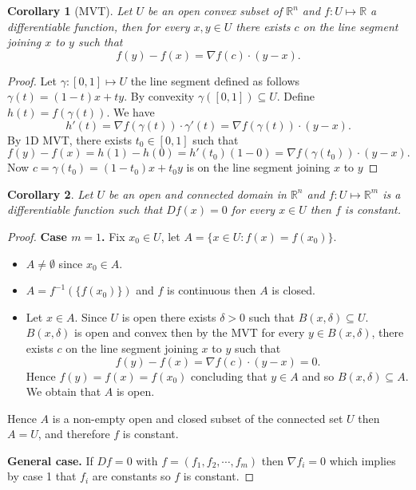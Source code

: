 \documentclass[11pt,openany]{book}
\theoremstyle{plain}
\newtheorem{corollary}{Corollary}[chapter]
\theoremstyle{definition}
\theoremstyle{remark}
\begin{document}
\begin{corollary}[MVT]
    Let $U$ be an open convex subset of $\mathbb R^n$ and $f:U\mapsto \mathbb R$ a differentiable function, then for every $x,y\in U$ there exists $c$ on the line segment joining $x$ to $y$ such that
    $$f(y)-f(x)=\nabla f(c)\cdot (y-x).$$
\end{corollary}

\begin{proof}
    Let $\gamma:[0,1]\mapsto U$ the line segment defined as follows $\gamma(t)=(1-t)x+ty$. By convexity $\gamma([0,1])\subseteq U$. Define $h(t)=f(\gamma (t)).$ We have $$h'(t)=\nabla f(\gamma(t))\cdot \gamma'(t)=\nabla f(\gamma(t))\cdot (y-x).$$
    By 1D MVT, there exists $t_0\in [0,1]$ such that
    $$f(y)-f(x)=h(1)-h(0)=h'(t_0)(1-0)=\nabla f(\gamma(t_0))\cdot (y-x).$$
    Now $c=\gamma(t_0)=(1-t_0)x+t_0y$ is on the line segment joining $x$ to $y$
\end{proof}

\begin{corollary}
    Let $U$ be an open and connected domain in $\mathbb R^n$ and $f:U\mapsto \mathbb R^m$ is a differentiable function such that $Df(x)=0$ for every $x\in U$ then $f$ is constant.
    
\end{corollary}

\begin{proof}
    {\bf Case $m=1$.} 
    Fix $x_0\in U$, let $A=\{x\in U: f(x)=f(x_0)\}.$ 
    \begin{itemize}
        \item $A\neq \emptyset$ since $x_0\in A$.
        \item $A=f^{-1}(\{f(x_0)\})$ and $f$ is continuous then $A$ is closed.
        \item Let $x\in A.$ Since $U$ is open there exists $\delta>0$ such that $B(x,\delta)\subseteq U$. $B(x,\delta)$ is open and convex then by the MVT for every $y\in B(x,\delta)$, there exists $c$ on the line segment joining $x$ to $y$ such that
        $$f(y)-f(x)=\nabla f(c)\cdot (y-x)=0.$$
        Hence $f(y)=f(x)=f(x_0)$ concluding that $y\in A$ and so $B(x,\delta)\subseteq A$. We obtain that $A$ is open.
    \end{itemize}

    Hence $A$ is a non-empty open and closed subset of the connected set $U$ then $A=U$, and therefore $f$ is constant.

    {\bf General case.} If $Df=0$ with $f=(f_1,f_2,\cdots,f_m)$ then $\nabla f_i=0$ which implies by case 1 that $f_i$ are constants so $f$ is constant.
\end{proof}
\end{document}
